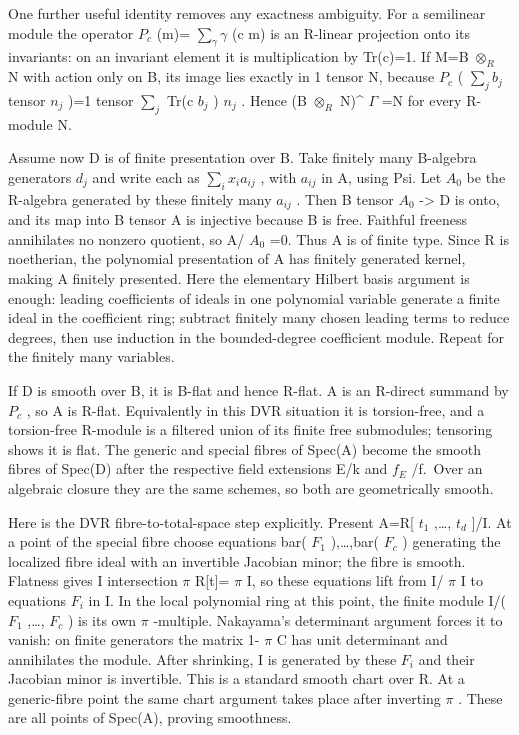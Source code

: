 \documentclass[
  11pt,
]{article}
\begin{document}
One further useful identity removes any exactness ambiguity. For a
semilinear module the operator \(P_{c}\) (m)= \(\sum_{\gamma} \gamma\)
(c m) is an R-linear projection onto its invariants: on an invariant
element it is multiplication by Tr(c)=1. If M=B \(\otimes_{R}\) N with
action only on B, its image lies exactly in 1 tensor N, because
\(P_{c}\) ( \(\sum_{j} b_{j}\) tensor \(n_{j}\) )=1 tensor \(\sum_{j}\)
Tr(c \(b_{j}\) ) \(n_{j}\) . Hence (B \(\otimes_{R}\) N)\^{} \(\Gamma\)
=N for every R-module N.

Assume now D is of finite presentation over B. Take finitely many
B-algebra generators \(d_{j}\) and write each as
\(\sum_{i} x_{i} a_{ij}\) , with \(a_{ij}\) in A, using Psi. Let
\(A_{0}\) be the R-algebra generated by these finitely many \(a_{ij}\) .
Then B tensor \(A_{0}\) -\textgreater{} D is onto, and its map into B
tensor A is injective because B is free. Faithful freeness annihilates
no nonzero quotient, so A/ \(A_{0}\) =0. Thus A is of finite type. Since
R is noetherian, the polynomial presentation of A has finitely generated
kernel, making A finitely presented. Here the elementary Hilbert basis
argument is enough: leading coefficients of ideals in one polynomial
variable generate a finite ideal in the coefficient ring; subtract
finitely many chosen leading terms to reduce degrees, then use induction
in the bounded-degree coefficient module. Repeat for the finitely many
variables.

If D is smooth over B, it is B-flat and hence R-flat. A is an R-direct
summand by \(P_{c}\) , so A is R-flat. Equivalently in this DVR
situation it is torsion-free, and a torsion-free R-module is a filtered
union of its finite free submodules; tensoring shows it is flat. The
generic and special fibres of Spec(A) become the smooth fibres of
Spec(D) after the respective field extensions E/k and \(f_{E}\) /f.~Over
an algebraic closure they are the same schemes, so both are
geometrically smooth.

Here is the DVR fibre-to-total-space step explicitly. Present A=R{[}
\(t_{1}\) ,\ldots, \(t_{d}\) {]}/I. At a point of the special fibre
choose equations bar( \(F_{1}\) ),\ldots,bar( \(F_{c}\) ) generating the
localized fibre ideal with an invertible Jacobian minor; the fibre is
smooth. Flatness gives I intersection \(\pi\) R{[}t{]}= \(\pi\) I, so
these equations lift from I/ \(\pi\) I to equations \(F_{i}\) in I. In
the local polynomial ring at this point, the finite module I/( \(F_{1}\)
,\ldots, \(F_{c}\) ) is its own \(\pi\) -multiple. Nakayama's
determinant argument forces it to vanish: on finite generators the
matrix 1- \(\pi\) C has unit determinant and annihilates the module.
After shrinking, I is generated by these \(F_{i}\) and their Jacobian
minor is invertible. This is a standard smooth chart over R. At a
generic-fibre point the same chart argument takes place after inverting
\(\pi\) . These are all points of Spec(A), proving smoothness.
\end{document}
